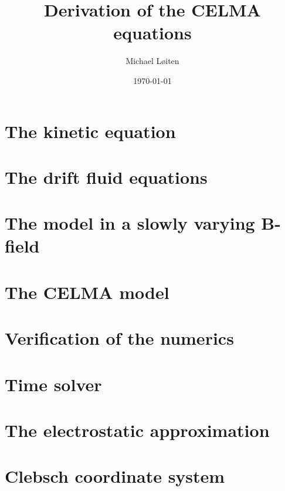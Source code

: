 \documentclass[12pt,a4paper,oneside,openright]{report} %
\title{\vspace{-8ex}Derivation of the CELMA equations\vspace{-1ex}}
\author{Michael L{\o}iten}
\date{\vspace{-2ex}\today}
\begin{document}
\maketitle

\chapter{The kinetic equation}

%
\chapter{The drift fluid equations}
\label{chap:drift-order}


\chapter{The model in a slowly varying B-field}


\chapter{The CELMA model}


%
%
\chapter{Verification of the numerics}
\label{app:verification}


\appendix

\chapter{Time solver}
\label{app:timeSolver}


\chapter{The electrostatic approximation}
\label{app:elstat}


\chapter{Clebsch coordinate system}
\label{app:Clebsch}

\end{document}
